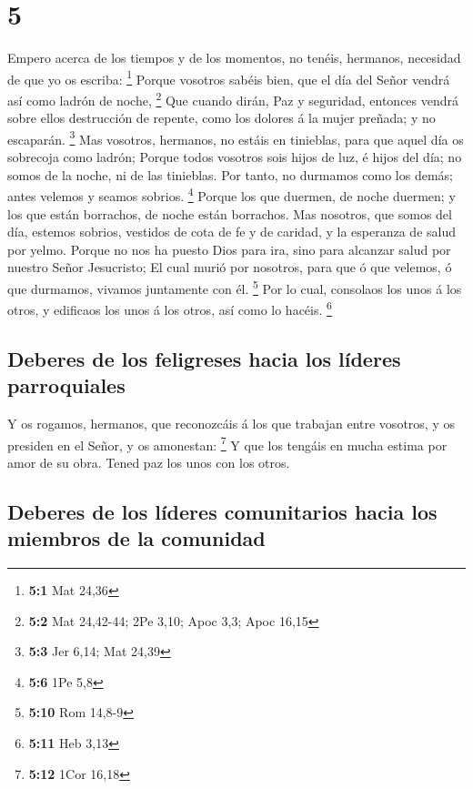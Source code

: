 \hypertarget{section-4}{%
\section{5}\label{section-4}}

 Empero acerca de los tiempos y de los momentos, no tenéis,
hermanos, necesidad de que yo os escriba: \footnote{\textbf{5:1} Mat
  24,36}  Porque vosotros sabéis bien, que el día del Señor
vendrá así como ladrón de noche, \footnote{\textbf{5:2} Mat 24,42-44;
  2Pe 3,10; Apoc 3,3; Apoc 16,15}  Que cuando dirán, Paz y
seguridad, entonces vendrá sobre ellos destrucción de repente, como los
dolores á la mujer preñada; y no escaparán. \footnote{\textbf{5:3} Jer
  6,14; Mat 24,39}  Mas vosotros, hermanos, no estáis en
tinieblas, para que aquel día os sobrecoja como ladrón; 
Porque todos vosotros sois hijos de luz, é hijos del día; no somos de la
noche, ni de las tinieblas.  Por tanto, no durmamos como los
demás; antes velemos y seamos sobrios. \footnote{\textbf{5:6} 1Pe 5,8}
 Porque los que duermen, de noche duermen; y los que están
borrachos, de noche están borrachos.  Mas nosotros, que
somos del día, estemos sobrios, vestidos de cota de fe y de caridad, y
la esperanza de salud por yelmo.  Porque no nos ha puesto
Dios para ira, sino para alcanzar salud por nuestro Señor Jesucristo;
 El cual murió por nosotros, para que ó que velemos, ó que
durmamos, vivamos juntamente con él. \footnote{\textbf{5:10} Rom 14,8-9}
 Por lo cual, consolaos los unos á los otros, y edificaos
los unos á los otros, así como lo hacéis. \footnote{\textbf{5:11} Heb
  3,13}

\hypertarget{deberes-de-los-feligreses-hacia-los-luxedderes-parroquiales}{%
\subsection{Deberes de los feligreses hacia los líderes
parroquiales}\label{deberes-de-los-feligreses-hacia-los-luxedderes-parroquiales}}

 Y os rogamos, hermanos, que reconozcáis á los que trabajan
entre vosotros, y os presiden en el Señor, y os amonestan: \footnote{\textbf{5:12}
  1Cor 16,18}  Y que los tengáis en mucha estima por amor
de su obra. Tened paz los unos con los otros.

\hypertarget{deberes-de-los-luxedderes-comunitarios-hacia-los-miembros-de-la-comunidad}{%
\subsection{Deberes de los líderes comunitarios hacia los miembros de la
comunidad}\label{deberes-de-los-luxedderes-comunitarios-hacia-los-miembros-de-la-comunidad}}

